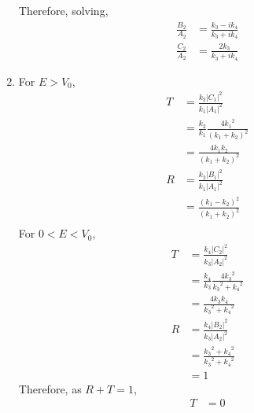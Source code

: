\documentclass[fleqn, a4paper, 11pt, oneside]{amsart}
\theoremstyle{definition}
\theoremstyle{theorem}
\begin{document}
\begin{solution}
\begin{enumerate}[leftmargin=*]
			Therefore, solving,
			\begin{align*}
				\frac{B_2}{A_2} & = \frac{k_3 - i k_4}{k_3 + i k_4} \\
				\frac{C_2}{A_2} & = \frac{2 k_3}{k_3 + i k_4}
			\end{align*}
		\item
			For $E > V_0$,
			\begin{align*}
				T & = \frac{k_2 |C_1|^2}{k_1 |A_1|^2}                 \\
                                  & = \frac{k_2}{k_1} \frac{4 {k_1}^2}{(k_1 + k_2)^2} \\
                                  & = \frac{4 k_1 k_2}{(k_1 + k_2)^2}                 \\
				R & = \frac{k_2 |B_1|^2}{k_1 |A_1|^2}                 \\
                                  & = \frac{(k_1 - k_2)^2}{(k_1 + k_2)^2}             \\
			\end{align*}
			For $0 < E < V_0$,
			\begin{align*}
				T & = \frac{k_4 |C_2|^2}{k_3 |A_2|^2}                     \\
                                  & = \frac{k_4}{k_3} \frac{4 {k_3}^2}{{k_3}^2 + {k_4}^2} \\
                                  & = \frac{4 k_3 k_4}{{k_3}^2 + {k_4}^2}                 \\
				R & = \frac{k_4 |B_2|^2}{k_3 |A_2|^2}                     \\
                                  & = \frac{{k_3}^2 + {k_4}^2}{{k_3}^2 + {k_4}^2}         \\
                                  & = 1
			\end{align*}
			Therefore, as $R + T = 1$,
			\begin{align*}
				T & = 0
			\end{align*}
	\end{enumerate}
\end{solution}
\end{document}

